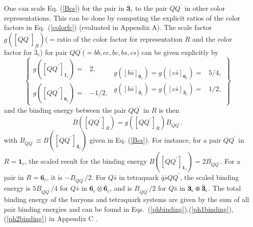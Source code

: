 \documentclass[12pt,prd,onecolumn,floatfix,nofootinbib]{revtex4}
\begin{document}
One can scale Eq. (\ref{Bcs}) for the pair in $\boldsymbol{\bar{3}}_{c}$ to
the pair $QQ^{\prime }$ in other color representations. This can be done by
computing the explicit ratios of the color factors in Eq.~(\ref{colorfc})
(evaluated in Appendix A). The scale factor $g([QQ^{\prime }]_{R})$($=$ratio
of the color factor for representation $R$ and the color factor for $\bar{3}%
_{c}$) for pair $QQ^{\prime }$($=bb,cc,bc,bs,cs$) can be given explicitly by
\begin{equation}
\left\{
\begin{array}{cc}
g([QQ^{\prime }]_{\boldsymbol{1}_{c}})= & 2, \\
g([QQ^{\prime }]_{\boldsymbol{6}_{c}})= & -1/2,%
\end{array}%
\begin{array}{cc}
g([b\bar{s}]_{\boldsymbol{6}_{c}})=g([c\bar{s}]_{\boldsymbol{6}_{c}})= & 5/4,
\\
g([b\bar{s}]_{\boldsymbol{\bar{3}}_{c}})=g([c\bar{s}]_{\boldsymbol{\bar{3}}_{c}})= & 1/2,%
\end{array}%
\right\}  \label{gf}
\end{equation}%
and the binding energy between the pair $QQ^{\prime }$ in $R$ is then
\begin{equation}
B([QQ^{\prime }]_{R})=g([QQ^{\prime }]_{R})B_{QQ^{\prime }}\text{.}
\label{BQQR}
\end{equation}%
with $B_{QQ^{\prime }}\equiv B([QQ^{\prime }]_{\boldsymbol{\bar{3}}_{c}})$
given in Eq. (\ref{Bcs}). For instance, for a pair $QQ^{\prime }$ in $R=%
\boldsymbol{1}_{c}$, the scaled result for the binding energy $B([QQ^{\prime
}]_{\boldsymbol{1}_{c}})=2B_{QQ^{\prime }}$. For a pair in $R=\boldsymbol{6}%
_{c}$, it is $-B_{QQ^{\prime }}/2$. For $Q\bar{s}$ in tetraquark $\bar{q}%
\bar{s}QQ^{\prime }$, the scaled binding energy is $5B_{QQ^{\prime }}/4$ for
$Q\bar{s}$ in $\boldsymbol{6}_{c}\otimes \boldsymbol{\bar{6}}_{c}$, and is $%
B_{QQ^{\prime }}/2$ for $Q\bar{s}$ in $\boldsymbol{3}_{c}\otimes \boldsymbol{%
\bar{3}}_{c}$. The total binding energy of the baryons and tetraquark
systems are given by the sum of all pair binding energies and can be found
in Eqs.~(\ref{phbinding}),(\ref{ph1binding}),(\ref{ph2binding}) in Appendix
C .
\end{document}
